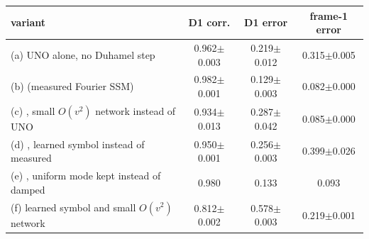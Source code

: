 \begin{tabular}{lccc}
\toprule
variant & D1 corr. & D1 error & frame-1 error \\
\midrule
(a) UNO alone, no Duhamel step & 0.962{\scriptsize$\pm$0.003} & 0.219{\scriptsize$\pm$0.012} & 0.315{\scriptsize$\pm$0.005} \\
(b) \DU{} (measured Fourier SSM) & 0.982{\scriptsize$\pm$0.001} & 0.129{\scriptsize$\pm$0.003} & 0.082{\scriptsize$\pm$0.000} \\
(c) \DU{}, small $O(v^2)$ network instead of UNO & 0.934{\scriptsize$\pm$0.013} & 0.287{\scriptsize$\pm$0.042} & 0.085{\scriptsize$\pm$0.000} \\
(d) \DU{}, learned symbol instead of measured & 0.950{\scriptsize$\pm$0.001} & 0.256{\scriptsize$\pm$0.003} & 0.399{\scriptsize$\pm$0.026} \\
(e) \DU{}, uniform mode kept instead of damped & 0.980 & 0.133 & 0.093 \\
(f) learned symbol and small $O(v^2)$ network & 0.812{\scriptsize$\pm$0.002} & 0.578{\scriptsize$\pm$0.003} & 0.219{\scriptsize$\pm$0.001} \\
\bottomrule
\end{tabular}
